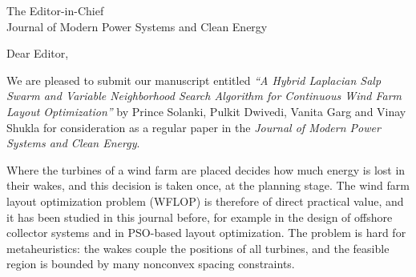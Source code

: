\documentclass[11pt]{letter}
\begin{document}
\begin{letter}{The Editor-in-Chief\\Journal of Modern Power Systems and Clean Energy}
\opening{Dear Editor,}

We are pleased to submit our manuscript entitled \textit{``A Hybrid Laplacian Salp Swarm and Variable Neighborhood Search Algorithm for Continuous Wind Farm Layout Optimization''} by Prince Solanki, Pulkit Dwivedi, Vanita Garg and Vinay Shukla for consideration as a regular paper in the \textit{Journal of Modern Power Systems and Clean Energy}.

Where the turbines of a wind farm are placed decides how much energy is lost in their wakes, and this decision is taken once, at the planning stage. The wind farm layout optimization problem (WFLOP) is therefore of direct practical value, and it has been studied in this journal before, for example in the design of offshore collector systems and in PSO-based layout optimization. The problem is hard for metaheuristics: the wakes couple the positions of all turbines, and the feasible region is bounded by many nonconvex spacing constraints.


\end{letter}
\end{document}
